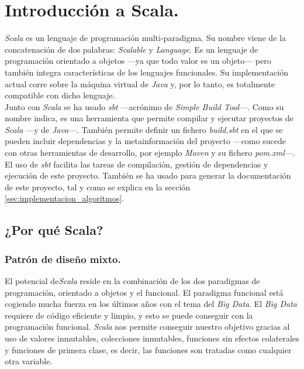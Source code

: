 \chapter{Introducción a Scala.} \label{ch:scala}

\textit{Scala} \cite{scala} es un lenguaje de programación multi-paradigma. Su nombre viene de la concatenación de dos palabras: \textit{Scalable} y \textit{Language}. Es un lenguaje de programación orientado a objetos —ya que todo valor es un objeto— pero también integra características de los lenguajes funcionales. Su implementación actual corre sobre la máquina virtual de \textit{Java} y, por lo tanto, es totalmente compatible con dicho lenguaje. \\

Junto con \textit{Scala} se ha usado \textit{sbt} \cite{sbt} —acrónimo de \textit{Simple Build Tool}—. Como su nombre indica, es una herramienta que permite compilar y ejecutar proyectos de \textit{Scala} —y de \textit{Java}—. También permite definir un fichero \textit{build.sbt} en el que se pueden incluir dependencias y la metainformación del proyecto —como sucede con otras herramientas de desarrollo, por ejemplo \textit{Maven} \cite{maven} y su fichero \textit{pom.xml}—. El uso de \textit{sbt} facilita las tareas de compilación, gestión de dependencias y ejecución de este proyecto. También se ha usado para generar la documentación de este proyecto, tal y como se explica en la sección \ref{sec:implementacion_algoritmos}.

\section{¿Por qué Scala?} \label{sec:scala}

\subsection{Patrón de diseño mixto.} \label{subsec:patron}

El potencial de\textit{Scala} reside en la combinación de los dos paradigmas de programación, orientado a objetos y el funcional. El paradigma funcional está cogiendo mucha fuerza en los últimos años con el tema del \textit{Big Data}. El \textit{Big Data} requiere de código eficiente y limpio, y esto se puede conseguir con la programación funcional. \textit{Scala} nos permite conseguir nuestro objetivo gracias al uso de valores inmutables, colecciones inmutables, funciones sin efectos colaterales y funciones de primera clase, es decir, las funciones son tratadas como cualquier otra variable.

